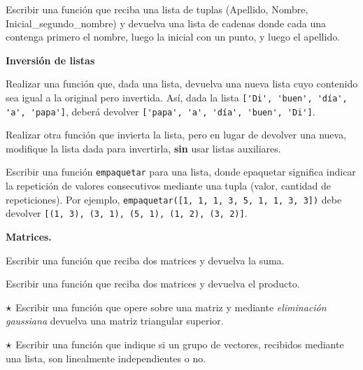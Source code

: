 \begin{ejercicio}
Escribir una función que reciba una lista de tuplas (Apellido,
Nombre, Inicial\_segundo\_nombre) y devuelva una lista de cadenas
donde cada una contenga primero el nombre, luego la inicial con un punto, y luego el
apellido.
\end{ejercicio}


\begin{ejercicio}{\bf Inversión de listas}
\begin{partes}
\item Realizar una función que, dada una lista, devuelva una nueva lista cuyo
contenido sea igual a la original pero invertida. Así, dada la lista
\lstinline!['Di', 'buen', 'día', 'a', 'papa']!, deberá devolver
\lstinline!['papa', 'a', 'día', 'buen', 'Di']!.

\item Realizar otra función que invierta la lista, pero en lugar de devolver
una nueva, modifique la lista dada para invertirla, {\bf sin}  usar listas
auxiliares.
\end{partes}
\end{ejercicio}


\begin{ejercicio}
Escribir una función \texttt{empaquetar} para una lista, donde
epaquetar significa indicar la repetición de valores consecutivos
mediante una tupla (valor, cantidad de repeticiones). Por ejemplo,
\lstinline!empaquetar([1, 1, 1, 3, 5, 1, 1, 3, 3])! debe devolver
\lstinline![(1, 3), (3, 1), (5, 1), (1, 2), (3, 2)]!.
\end{ejercicio}


\begin{ejercicio}
{\bf Matrices.}
\begin{partes}
\item Escribir una función que reciba dos matrices y devuelva la suma.
\item Escribir una función que reciba dos matrices y devuelva el producto.
\item $\dificil$ Escribir una función que opere sobre una matriz y mediante
\emph{eliminación gaussiana} devuelva una matriz triangular superior.
\item $\dificil$ Escribir una función que indique si un grupo de vectores, recibidos
mediante una lista, son linealmente independientes o no.
\end{partes}
\end{ejercicio}


